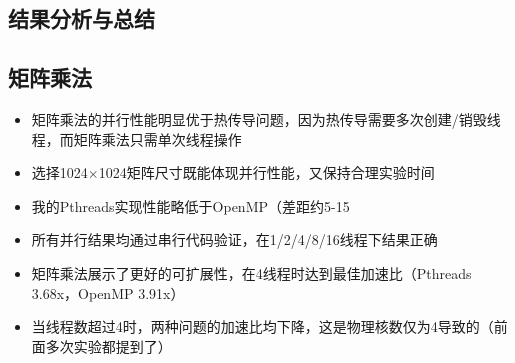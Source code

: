 \documentclass{SYSUReport}
\begin{document}
\subsection{结果分析与总结}
\subsection{矩阵乘法}
\begin{itemize}
\item 矩阵乘法的并行性能明显优于热传导问题，因为热传导需要多次创建/销毁线程，而矩阵乘法只需单次线程操作
\item 选择1024×1024矩阵尺寸既能体现并行性能，又保持合理实验时间
\item 我的Pthreads实现性能略低于OpenMP（差距约5-15%
\item 所有并行结果均通过串行代码验证，在1/2/4/8/16线程下结果正确
\item 矩阵乘法展示了更好的可扩展性，在4线程时达到最佳加速比（Pthreads 3.68x，OpenMP 3.91x）
\item 当线程数超过4时，两种问题的加速比均下降，这是物理核数仅为4导致的（前面多次实验都提到了）
\end{itemize}
\begin{table}[h!]
\centering
\caption{矩阵乘法性能对比 (Pthreads vs OpenMP, 矩阵尺寸: 1024×1024)}
\label{tab:matmul_performance}
\end{table}
\end{document}
